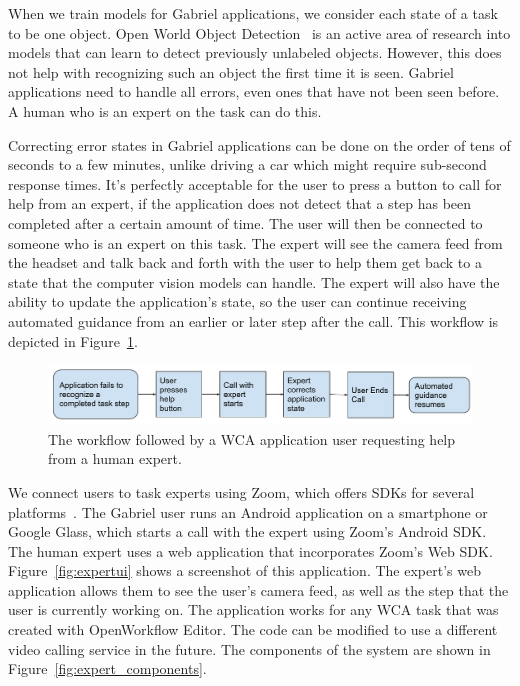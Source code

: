 When we train models for Gabriel applications, we consider each state of a task
to be one object. Open World Object Detection~\cite{joseph2021open} is an active
area of research into models that can learn to detect previously unlabeled
objects. However, this does not help with recognizing such an object the first
time it is seen. Gabriel applications need to handle all errors, even ones that
have not been seen before. A human who is an expert on the task can do this.

Correcting error states in Gabriel applications can be done on the order of tens
of seconds to a few
minutes, unlike driving a car which might require sub-second response times.
It's perfectly acceptable for the user to press a button to call for help from
an expert, if the application does not detect that a step has been completed
after a certain amount of time. The user will then be connected to someone who
is an expert on this task. The expert will
see the camera feed from the headset and talk back and forth with the user to
help them get back to a state that the computer vision models can handle.
The expert will also have the ability to update the application's state, so the
user can continue receiving automated guidance from an earlier or later
step after the call.
This workflow is depicted in Figure~\ref{fig:zoom_workflow}.

\begin{figure}[h]
  \includegraphics[width=\textwidth]{figures/zoom_workflow.pdf}
  \caption{The workflow followed by a WCA application user requesting help from
    a human expert.
  }\label{fig:zoom_workflow}
\end{figure}

We connect users to task experts using Zoom, which offers SDKs for several
platforms~\cite{Zoom}. The Gabriel user runs an Android application on a
smartphone or Google Glass, which starts a call with the expert using Zoom's
Android SDK.
The human expert uses a web application that incorporates Zoom's Web SDK.
Figure~\ref{fig:expertui} shows a screenshot of this application.
The expert's web application allows them to see the user's camera feed, as well
as the step that the user is currently working on.
The application works for any WCA task that was created with OpenWorkflow
Editor.
The code can be modified to use a different video calling service in the future.
The components of the system are shown in Figure~\ref{fig:expert_components}.

